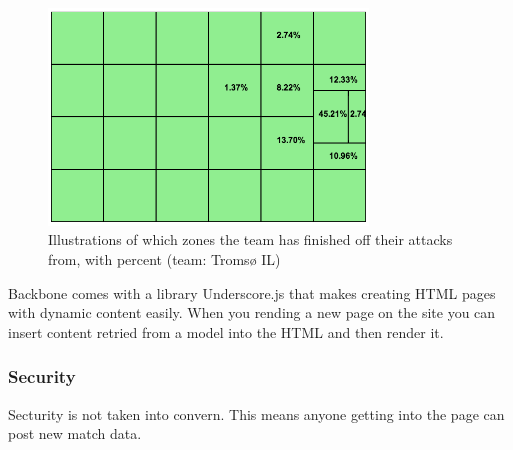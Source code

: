 \begin{figure}[ht!]
\centering
\includegraphics[width=85mm]{images/general/finishing_zones.png}
\caption{Illustrations of which zones the team has finished off their attacks from, with percent (team: Tromsø IL)}
\label{overflow}
\end{figure}

Backbone comes with a library Underscore.js that makes creating HTML pages with dynamic content easily. When you rending a new page on the site you can insert content retried from a model into the HTML and then render it.





\subsubsection{Security}
Secturity is not taken into convern. This means anyone getting into the page can post new match data. 